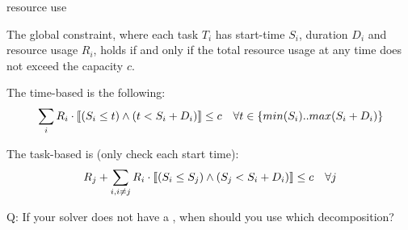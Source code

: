 \documentclass{cons-beamer}
\begin{document}
\begin{frame}{ resource use}
  \begin{definition}
    The  global constraint, 
    where each task $T_i$ has start-time $S_i$,  duration $D_i$ and resource usage $R_i$, holds if and only if the total resource usage at any time does not exceed the capacity $c$.
  \end{definition}
  \vfill

  The time-based  is the following:
  \begin{align*}
  	& \sum_{i} R_i \cdot \llbracket ( S_i \leq t) \wedge ( t < S_i + D_i ) \rrbracket \leq c  & \forall t \in \{min(S_i) .. max(S_i+D_i)\}
  \end{align*}
  \vfill

  The task-based  is (only check each start time):
  \begin{align*}
  	& R_j + \sum_{i, i\neq j} R_i \cdot \llbracket ( S_i \leq S_j ) \wedge ( S_j < S_i + D_i ) \rrbracket \leq c   & \forall j
  \end{align*}
  \vfill

  \pause
  Q: If your solver does not have a , when should you use which decomposition?
\end{frame}
%	
\end{document}
